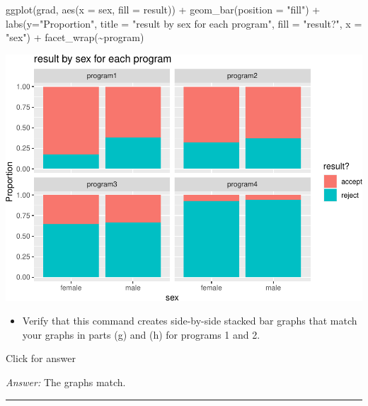 \documentclass[
]{book}
\newenvironment{Shaded}{\begin{snugshade}}{\end{snugshade}}
\newcommand{\AttributeTok}[1]{\textcolor[rgb]{0.77,0.63,0.00}{#1}}
\newcommand{\FunctionTok}[1]{\textcolor[rgb]{0.00,0.00,0.00}{#1}}
\newcommand{\NormalTok}[1]{#1}
\newcommand{\SpecialCharTok}[1]{\textcolor[rgb]{0.00,0.00,0.00}{#1}}
\newcommand{\StringTok}[1]{\textcolor[rgb]{0.31,0.60,0.02}{#1}}
\providecommand{\tightlist}{%
  \setlength{\itemsep}{0pt}\setlength{\parskip}{0pt}}
\begin{document}
\begin{Shaded}
\begin{Highlighting}[]
\FunctionTok{ggplot}\NormalTok{(grad, }\FunctionTok{aes}\NormalTok{(}\AttributeTok{x =}\NormalTok{ sex, }\AttributeTok{fill =}\NormalTok{ result)) }\SpecialCharTok{+} 
  \FunctionTok{geom\_bar}\NormalTok{(}\AttributeTok{position =} \StringTok{"fill"}\NormalTok{) }\SpecialCharTok{+} 
  \FunctionTok{labs}\NormalTok{(}\AttributeTok{y=}\StringTok{"Proportion"}\NormalTok{, }
       \AttributeTok{title =} \StringTok{"result by sex for each program"}\NormalTok{, }
       \AttributeTok{fill =} \StringTok{"result?"}\NormalTok{, }
       \AttributeTok{x =} \StringTok{"sex"}\NormalTok{) }\SpecialCharTok{+} 
  \FunctionTok{facet\_wrap}\NormalTok{(}\SpecialCharTok{\textasciitilde{}}\NormalTok{program)}
\end{Highlighting}
\end{Shaded}

\includegraphics[width=1\linewidth]{Class_Activity_4_files/figure-latex/unnamed-chunk-35-1}

\begin{itemize}
\tightlist
\item
  Verify that this command creates side-by-side stacked bar graphs that match your graphs in parts (g) and (h) for programs 1 and 2.
\end{itemize}

Click for answer

\emph{Answer:} The graphs match.

\begin{center}\rule{0.5\linewidth}{0.5pt}\end{center}
\end{document}

